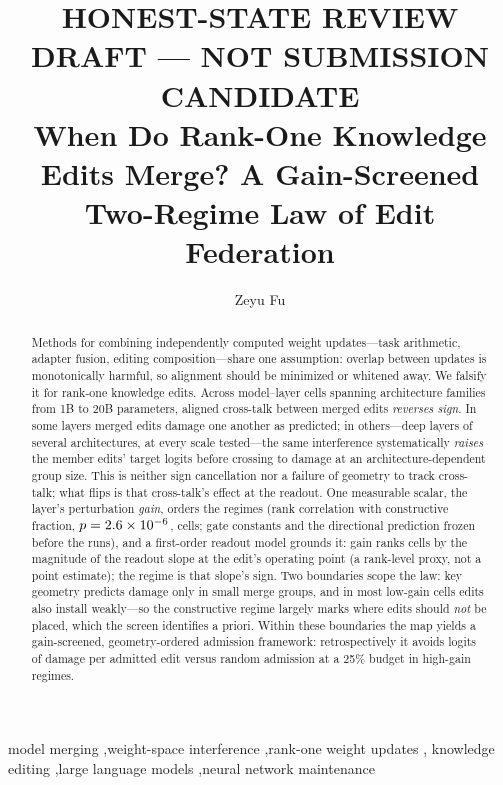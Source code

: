 \documentclass[preprint,12pt]{elsarticle}
\theoremstyle{definition}
\begin{document}
\begin{frontmatter}

\title{{\color{red}\bfseries HONEST-STATE REVIEW DRAFT --- NOT SUBMISSION CANDIDATE}\\[1.5em]
When Do Rank-One Knowledge Edits Merge? A Gain-Screened Two-Regime Law of Edit Federation}

\author[1]{Zeyu Fu}

\begin{abstract}
Methods for combining independently computed weight updates---task arithmetic, adapter
fusion, editing composition---share one assumption: overlap between updates is
monotonically harmful, so alignment should be minimized or whitened away. We falsify it
for rank-one knowledge edits. Across \nCells{} model--layer cells
spanning \nFamilies{} architecture families from 1B to 20B parameters, aligned cross-talk
between merged edits \emph{reverses sign}. In some layers merged edits damage one another
as predicted; in others---deep layers of several architectures, at every scale
tested---the same interference systematically \emph{raises} the member edits' target
logits before crossing to damage at an architecture-dependent group size. This is
neither sign cancellation nor a failure of
geometry to track cross-talk; what flips is that cross-talk's effect at the readout. One
measurable scalar, the layer's perturbation \emph{gain}, orders the regimes (rank
correlation \ordSpearman{} with constructive fraction, $p=2.6\times10^{-6}{}$, \nCells{}
cells; gate constants and the directional prediction frozen before the runs), and a
first-order readout model grounds it: gain ranks cells by the magnitude of the
readout slope at the edit's operating point (a rank-level proxy, not a point
estimate); the regime is that slope's sign. Two boundaries scope
the law: key geometry predicts damage only in small merge groups, and in most low-gain
cells edits also install weakly---so the constructive regime largely marks where edits
should \emph{not} be placed, which the screen identifies a priori. Within these
boundaries the map yields a gain-screened, geometry-ordered admission framework:
retrospectively it avoids \benefitHighQtwofive{} logits of damage per admitted edit
versus random admission at a 25\% budget in high-gain regimes.
\end{abstract}

\begin{keyword}
model merging \sep weight-space interference \sep rank-one weight updates \sep
knowledge editing \sep large language models \sep neural network maintenance
\end{keyword}
\end{frontmatter}
\end{document}
